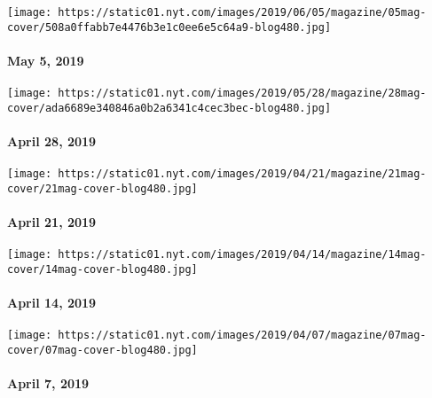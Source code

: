 \href{https://www.nytimes.com/issue/magazine/2019/05/17/the-5519-issue}{}

\texttt{[image: https://static01.nyt.com/images/2019/06/05/magazine/05mag-cover/508a0ffabb7e4476b3e1c0ee6e5c64a9-blog480.jpg]}

\hypertarget{may-5-2019}{%
\paragraph{May 5, 2019}\label{may-5-2019}}

\href{https://www.nytimes.com/issue/magazine/2019/05/17/the-42819-issue}{}

\texttt{[image: https://static01.nyt.com/images/2019/05/28/magazine/28mag-cover/ada6689e340846a0b2a6341c4cec3bec-blog480.jpg]}

\hypertarget{april-28-2019}{%
\paragraph{April 28, 2019}\label{april-28-2019}}

\href{https://www.nytimes.com/issue/magazine/2019/04/23/the-42119-issue}{}

\texttt{[image: https://static01.nyt.com/images/2019/04/21/magazine/21mag-cover/21mag-cover-blog480.jpg]}

\hypertarget{april-21-2019}{%
\paragraph{April 21, 2019}\label{april-21-2019}}

\href{https://www.nytimes.com/issue/magazine/2019/04/12/the-41419-issue}{}

\texttt{[image: https://static01.nyt.com/images/2019/04/14/magazine/14mag-cover/14mag-cover-blog480.jpg]}

\hypertarget{april-14-2019}{%
\paragraph{April 14, 2019}\label{april-14-2019}}

\href{https://www.nytimes.com/issue/magazine/2019/04/06/the-4719-issue}{}

\texttt{[image: https://static01.nyt.com/images/2019/04/07/magazine/07mag-cover/07mag-cover-blog480.jpg]}

\hypertarget{april-7-2019}{%
\paragraph{April 7, 2019}\label{april-7-2019}}

